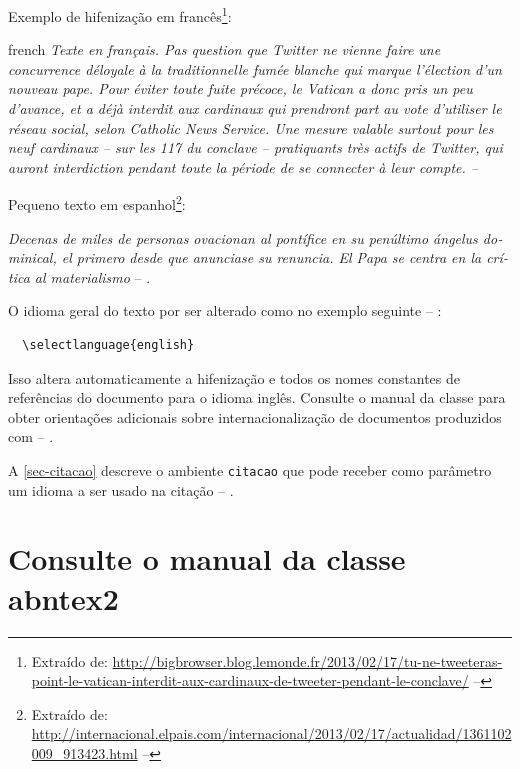 Exemplo de hifenização em francês\footnote{Extraído de:
    \url{http://bigbrowser.blog.lemonde.fr/2013/02/17/tu-ne-tweeteras-point-le-vatican-interdit-aux-cardinaux-de-tweeter-pendant-le-conclave/} -- \showfont}:

\begin{otherlanguage*}{french}
    \textit{Texte en français. Pas question que Twitter ne vienne faire une
        concurrence déloyale à la traditionnelle fumée blanche qui mar\-que l'élection
        d'un nouveau pape. Pour éviter toute fuite précoce, le Vatican a donc pris un
        peu d'avance, et a déjà interdit aux cardinaux qui prendront part au vote
        d'utiliser le réseau social, selon Catholic News Service. Une mesure valable
        surtout pour les neuf cardinaux – sur les 117 du conclave – pratiquants très
        actifs de Twitter, qui auront interdiction pendant toute la période de se
        connecter à leur compte. -- \showfont}
\end{otherlanguage*}

Pequeno texto em espanhol\footnote{Extraído de:
    \url{http://internacional.elpais.com/internacional/2013/02/17/actualidad/1361102009_913423.html} -- \showfont}:

\foreignlanguage{spanish}{\textit{Decenas de miles de personas ovacionan al pontífice en su
        penúltimo ángelus dominical, el primero desde que anunciase su renuncia. El Papa se
        centra en la crítica al materialismo}} -- \showfont.

O idioma geral do texto por ser alterado como no exemplo seguinte -- \showfont:

\begin{verbatim}
  \selectlanguage{english}
\end{verbatim}

Isso altera automaticamente a hifenização e todos os nomes constantes de
referências do documento para o idioma inglês. Consulte o manual da classe
\cite{abntex2classe} para obter orientações adicionais sobre internacionalização de
documentos produzidos com \abnTeX{} -- \showfont.

A \autoref{sec-citacao} descreve o ambiente \texttt{citacao} que pode receber
como parâmetro um idioma a ser usado na citação -- \showfont.



\section{Consulte o manual da classe \textsf{abntex2}}

